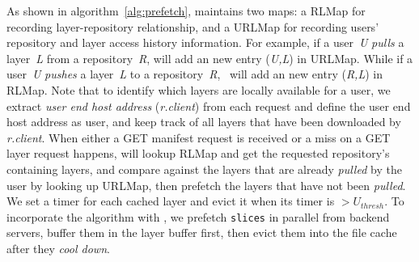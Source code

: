 
As shown in algorithm~\ref{alg:prefetch}, \sysname maintains two maps: a RLMap for recording layer-repository
relationship, and 
a URLMap for recording 
users' repository and layer access history information. 
For example, if a user~\emph{U} \emph{pulls} a layer~\emph{L} from a repository~\emph{R},
\sysname will add an new entry (\emph{U,L}) in URLMap.
While if a user~\emph{U} \emph{pushes} a  layer~\emph{L} to a repository~\emph{R},
\sysname~will add an new entry (\emph{R,L}) in RLMap. 
Note that to identify which layers are locally available for a user, 
we extract \emph{user end host address} (\emph{r.client}) 
from each request and define the user end host address as user,
and keep track of all layers that have been downloaded by \emph{r.client}. 
When either a GET manifest request is received or 
a miss on a GET layer request happens,
\sysname will lookup RLMap and get the requested repository's containing layers,
and compare against the layers that are already \emph{pulled} by the user by looking up URLMap,
then prefetch the layers that have not been \emph{pulled}. 
We set a timer for each cached layer and evict it when its timer is $>U_{thresh}$.
To incorporate the algorithm with \sysname,
we prefetch \texttt{slices} in parallel from backend servers,  
buffer them in the layer buffer first, then evict them into the file cache after they \emph{cool down}.

 

